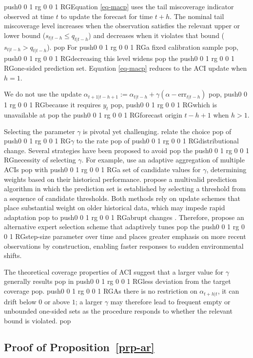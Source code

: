 \documentclass[
  american,
  12pt]{article}
\theoremstyle{plain}
\theoremstyle{plain}
\theoremstyle{remark}
\newcommand{\CPTSadd}[1]{\ifmmode\else\leavevmode\fi\pdfcolorstack 0 push{0 0 1 rg 0 0 1 RG}#1\pdfcolorstack 0 pop}
\begin{document}
\CPTSadd{Equation \eqref{eq-macp} uses the tail miscoverage indicator observed at
time \(t\) to update the forecast for time \(t+h\). The nominal tail
miscoverage level increases when the observation satisfies the relevant
upper or lower bound (\(s_{t|t-h}\leq q_{t|t-h}\)) and decreases when it
violates that bound (\(s_{t|t-h}>q_{t|t-h}\)).} For \CPTSadd{a fixed calibration
sample}, \CPTSadd{decreasing this level widens} the \CPTSadd{one-sided prediction set.
Equation \eqref{eq-macp} reduces to the ACI update when \(h=1\).

We do not use the update
\(\alpha_{t+1|t-h+1} := \alpha_{t|t-h} + \gamma(\alpha - \mathrm{err}_{t|t-h})\)},
\CPTSadd{because it requires \(y_t\)}, \CPTSadd{which is unavailable at} the \CPTSadd{forecast origin
\(t-h+1\) when \(h>1\).

Selecting the parameter \(\gamma\) is pivotal yet challenging.
\citet{gibbs2021} relate the choice} of \CPTSadd{\(\gamma\) to the rate} of
\CPTSadd{distributional change. Several strategies have been proposed to avoid}
the \CPTSadd{necessity of selecting \(\gamma\). For example, \citet{zaffran2022}
use an adaptive aggregation of multiple ACIs} with \CPTSadd{a set of candidate
values for \(\gamma\), determining weights based on their historical
performance. \citet{bastani2022} propose a multivalid prediction
algorithm in which the prediction set is established by selecting a
threshold from a sequence of candidate thresholds. Both methods rely on
update schemes that place substantial weight on older historical data,
which may impede rapid adaptation} to \CPTSadd{abrupt changes \citep{gibbs2024}.
Therefore, \citet{gibbs2024} propose an alternative expert selection
scheme that adaptively tunes} the \CPTSadd{step-size parameter over time and
places greater emphasis on more recent observations by construction,
enabling faster responses to sudden environmental shifts.

The theoretical coverage properties of ACI suggest that a larger value
for \(\gamma\) generally results} in \CPTSadd{less deviation from the target
coverage}. \CPTSadd{As there is no restriction on \(\alpha_{t+h|t}\), it can drift
below \(0\) or above \(1\); a larger \(\gamma\) may therefore lead to
frequent empty or unbounded one-sided sets as the procedure responds to
whether the relevant bound is violated.}

\subsection{\texorpdfstring{Proof of
Proposition~\ref{prp-ar}}{Proof of Proposition~}}\label{sec-proof_ar}
\end{document}
